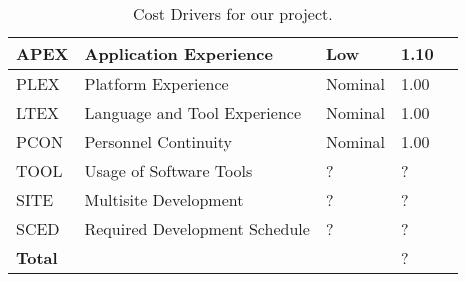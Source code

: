 \begin{table}[h]
\begin{tabular}{| l | l | l | l | l |}
        \hline
        APEX            & Application Experience                    & Low                 & 1.10                 \\
        \hline
        PLEX            & Platform Experience                       & Nominal              & 1.00                \\
        \hline
        LTEX            & Language and Tool Experience              & Nominal              & 1.00                \\
        \hline
        PCON            & Personnel Continuity                      & Nominal              & 1.00                \\
        \hline
        TOOL            & Usage of Software Tools                   & ?                 & ?                 \\
        \hline
        SITE            & Multisite Development                     & ?                 & ?                 \\
        \hline
        SCED            & Required Development Schedule             & ?                 & ?                 \\
        \hline
        \textbf{Total}  & \multicolumn{2}{|c|}{~}                                       & ?                 \\
        \hline
    \end{tabular}
    \caption{Cost Drivers for our project.}
    \label{tab:cost-drivers}
\end{table}
